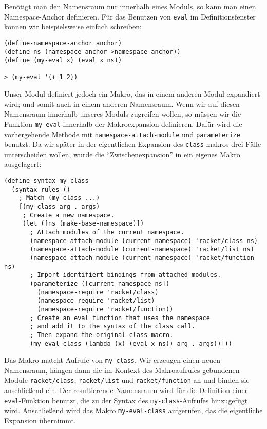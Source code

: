 Benötigt man den Namensraum nur innerhalb eines Moduls, so kann man einen Name\-space-An\-chor definieren. Für das Benutzen von \texttt{eval} im Definitionsfenster können wir beispielsweise einfach schreiben:

\begin{lstlisting}
(define-namespace-anchor anchor)
(define ns (namespace-anchor->namespace anchor))
(define (my-eval x) (eval x ns))

> (my-eval '(+ 1 2))
\end{lstlisting}
{}

Unser Modul definiert jedoch ein Makro, das in einem anderen Modul expandiert wird; und somit auch in einem anderen Namensraum. Wenn wir auf diesen Namensraum innerhalb unseres Moduls zugreifen wollen, so müssen wir die Funktion \texttt{my-eval} innerhalb der Makroexpansion definieren. Dafür wird die vorhergehende Methode mit \texttt{namespace-attach-module} und \texttt{parameterize} benutzt. Da wir später in der eigentlichen Expansion des \texttt{class}-makros drei Fälle unterscheiden wollen, wurde die ``Zwischenexpansion'' in ein eigenes Makro ausgelagert:

\begin{lstlisting}
(define-syntax my-class
  (syntax-rules ()
    ; Match (my-class ...)
    [(my-class arg . args)
     ; Create a new namespace.
     (let ([ns (make-base-namespace)])
       ; Attach modules of the current namespace.
       (namespace-attach-module (current-namespace) 'racket/class ns)
       (namespace-attach-module (current-namespace) 'racket/list ns)
       (namespace-attach-module (current-namespace) 'racket/function ns)
       ; Import identifiert bindings from attached modules.
       (parameterize ([current-namespace ns])
         (namespace-require 'racket/class)
         (namespace-require 'racket/list)
         (namespace-require 'racket/function))
       ; Create an eval function that uses the namespace
       ; and add it to the syntax of the class call.
       ; Then expand the original class macro.
       (my-eval-class (lambda (x) (eval x ns)) arg . args))]))
\end{lstlisting}

Das Makro matcht Aufrufe von \texttt{my-class}. Wir erzeugen einen neuen Namensraum, hängen dann die im Kontext des Makroaufrufes gebundenen Module \texttt{racket/class}, \texttt{racket/list} und \texttt{racket/function} an und binden sie anschließend ein. Der resultierende Namensraum wird für die Definition einer \texttt{eval}-Funktion benutzt, die zu der Syntax des \texttt{my-class}-Aufrufes hinzugefügt wird. Anschließend wird das Makro \texttt{my-eval-class} aufgerufen, das die eigentliche Expansion übernimmt.


